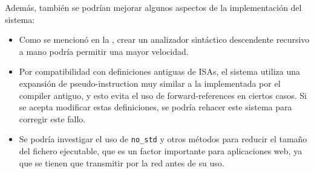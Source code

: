 \noindent
Además, también se podrían mejorar algunos aspectos de la implementación del
sistema:

\begin{itemize}
    \item Como se mencionó en la , crear un analizador
    sintáctico descendente recursivo a mano podría permitir una mayor velocidad.
    \item Por compatibilidad con definiciones antiguas de \glspl{ISA}, el
    sistema utiliza una expansión de \gls{pseudo-instruction} muy similar a la
    implementada por el \gls{compiler} antiguo, y esto evita el uso de
    \glspl{forward-reference} en ciertos casos. Si se acepta modificar estas
    definiciones, se podría rehacer este sistema para corregir este fallo.
    \item Se podría investigar el uso de \verb!no_std! \parencite{no-std} y
    otros métodos para reducir el tamaño del fichero ejecutable, que es un
    factor importante para aplicaciones web, ya que se tienen que transmitir por
    la red antes de su uso.
\end{itemize}
